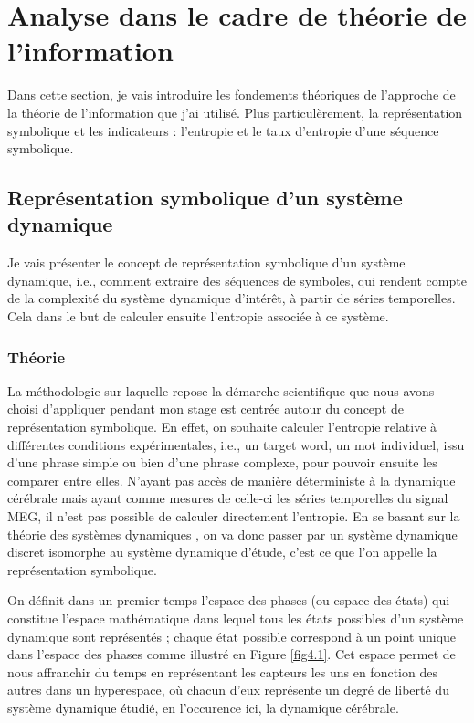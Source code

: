 \chapter{Analyse dans le cadre de théorie de l'information}

Dans cette section, je vais introduire les fondements théoriques de l'approche de la théorie de l'information que j'ai utilisé. Plus particulèrement, la représentation symbolique et les indicateurs : l'entropie et le taux d'entropie d'une séquence symbolique.

\section{Représentation symbolique d'un système dynamique}

Je vais présenter le concept de représentation symbolique d'un système dynamique, i.e., comment extraire des séquences de symboles, qui rendent compte de la complexité du système dynamique d'intérêt, à partir de séries temporelles. Cela dans le but de calculer ensuite l'entropie associée à ce système.

\subsection{Théorie}

La méthodologie sur laquelle repose la démarche scientifique que nous avons choisi d'appliquer pendant mon stage est centrée autour du concept de représentation symbolique. En effet, on souhaite calculer l'entropie relative à différentes conditions expérimentales, i.e., un target word, un mot individuel, issu d'une phrase simple ou bien d'une phrase complexe, pour pouvoir ensuite les comparer entre elles. N'ayant pas accès de manière déterministe à la dynamique cérébrale mais ayant comme mesures de celle-ci les séries temporelles du signal MEG, il n'est pas possible de calculer directement l'entropie. En se basant sur la théorie des systèmes dynamiques \cite{3}, on va donc passer par un système dynamique discret isomorphe au système dynamique d'étude, c'est ce que l'on appelle la représentation symbolique. 

On définit dans un premier temps l'espace des phases (ou espace des états) \cite{18} qui constitue l'espace mathématique dans lequel tous les états possibles d'un système dynamique sont représentés ; chaque état possible correspond à un point unique dans l'espace des phases comme illustré en Figure \ref{fig4.1}. Cet espace permet de nous affranchir du temps en représentant les capteurs les uns en fonction des autres dans un hyperespace, où chacun d'eux représente un degré de liberté du système dynamique étudié, en l'occurence ici, la dynamique cérébrale.

